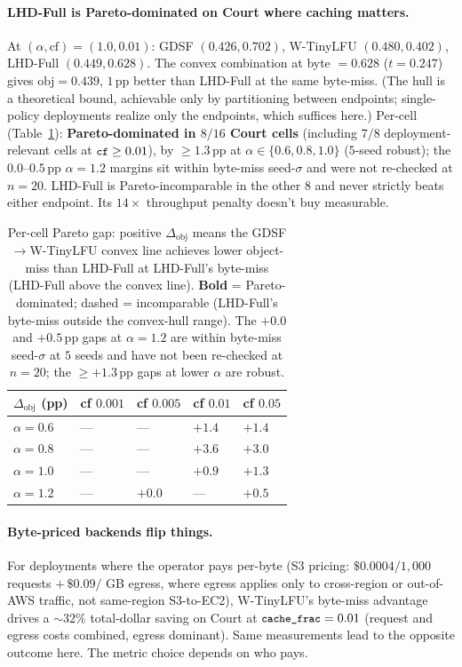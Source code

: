 \documentclass[letterpaper,twocolumn,10pt]{article}
\newcommand{\code}[1]{\texttt{\small #1}}
\begin{document}
\paragraph{LHD-Full is Pareto-dominated on Court where caching
matters.} At $(\alpha, \text{cf}) = (1.0, 0.01)$: GDSF $(0.426,
0.702)$, W-TinyLFU $(0.480, 0.402)$, LHD-Full $(0.449, 0.628)$.
The convex combination at byte $= 0.628$ ($t = 0.247$) gives
$\text{obj} = 0.439$, $1$\,pp better than LHD-Full at the same
byte-miss. (The hull is a theoretical bound, achievable only by
partitioning between endpoints; single-policy deployments realize
only the endpoints, which suffices here.) Per-cell
(Table~\ref{tab:lhdfull-pareto}): \textbf{Pareto-dominated in
$8/16$ Court cells} (including $7/8$ deployment-relevant cells at
$\code{cf} \geq 0.01$), by $\geq 1.3$\,pp at
$\alpha \in \{0.6, 0.8, 1.0\}$ ($5$-seed robust); the
$0.0$--$0.5$\,pp $\alpha=1.2$ margins sit within byte-miss
seed-$\sigma$ and were not re-checked at $n{=}20$. LHD-Full is
Pareto-incomparable in the other $8$ and never strictly
beats either endpoint. Its $14\times$ throughput penalty doesn't buy measurable.
\begin{table}[t]
\centering
\footnotesize
\renewcommand{\arraystretch}{0.95}
\begin{tabularx}{\columnwidth}{@{}lXXXX@{}}
\toprule
$\Delta_{\text{obj}}$ (pp)
& cf $0.001$ & cf $0.005$ & cf $0.01$ & cf $0.05$ \\
\midrule
$\alpha = 0.6$ & --- & --- & $\mathbf{+1.4}$ & $\mathbf{+1.4}$ \\
$\alpha = 0.8$ & --- & --- & $\mathbf{+3.6}$ & $\mathbf{+3.0}$ \\
$\alpha = 1.0$ & --- & --- & $\mathbf{+0.9}$ & $\mathbf{+1.3}$ \\
$\alpha = 1.2$ & --- & $\mathbf{+0.0}$ & --- & $\mathbf{+0.5}$ \\
\bottomrule
\end{tabularx}
\caption{Per-cell Pareto gap: positive $\Delta_{\text{obj}}$ means the
GDSF$\to$W-TinyLFU convex line achieves lower object-miss than LHD-Full
at LHD-Full's byte-miss (LHD-Full above the convex line). \textbf{Bold} = Pareto-dominated; dashed =
incomparable (LHD-Full's byte-miss outside the convex-hull range).
The $+0.0$ and $+0.5$\,pp gaps at $\alpha = 1.2$ are within byte-miss
seed-$\sigma$ at $5$ seeds and have not been re-checked at $n{=}20$;
the $\geq +1.3$\,pp gaps at lower $\alpha$ are robust.}
\label{tab:lhdfull-pareto}
\end{table}
\paragraph{Byte-priced backends flip things.} For
deployments where the operator pays per-byte (S3 pricing: $\$0.0004
/ 1{,}000$ requests $+\, \$0.09 /$ GB egress, where egress applies
only to cross-region or out-of-AWS traffic, not same-region
S3-to-EC2), W-TinyLFU's byte-miss advantage drives a $\sim 32\%$
total-dollar saving on Court at $\code{cache\_frac}=0.01$ (request
and egress costs combined, egress dominant). Same measurements lead to the opposite outcome here. The metric choice depends
on who pays.
\end{document}
